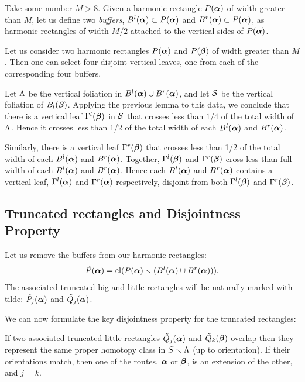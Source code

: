 Take some number $M>8$. 
Given a harmonic rectangle $P({\mbox{\boldmath$\alpha$} })$ of width greater than $M$, let us define two {\it buffers},
 $B^l({\mbox{\boldmath$\alpha$} })\subset P({\mbox{\boldmath$\alpha$} })$ and $B^r({\mbox{\boldmath$\alpha$} })\subset P({\mbox{\boldmath$\alpha$} })$,
as harmonic rectangles of width $M/2$ attached to the vertical sides of $P({\mbox{\boldmath$\alpha$} })$.   

\begin{lem}\label{disjoint curves}
 Let us consider two harmonic rectangles $P({\mbox{\boldmath$\alpha$} })$ and $P({\mbox{\boldmath$\beta$} })$ of width greater than $M$.
Then one can select four disjoint vertical leaves,
 one from each of the corresponding four buffers.
\end{lem}

\begin{pf}
Let ${\Lambda}$ be the vertical foliation in $B^l({\mbox{\boldmath$\alpha$} })\cup B^r({\mbox{\boldmath$\alpha$} })$,
 and let  ${\cal S}$ be the vertical foliation of $B_l({\mbox{\boldmath$\beta$} })$.  
  Applying  the previous lemma to  this data, we conclude that
there is a vertical leaf $\Gamma^l({\mbox{\boldmath$\beta$} })$ in ${\cal S}$ that crosses less than  $1/4$ of the total width of ${\Lambda}$.
Hence it crosses less than  1/2 of the total width of each $B^l({\mbox{\boldmath$\alpha$} })$ and $ B^r({\mbox{\boldmath$\alpha$} })$. 

Similarly, there is a vertical leaf $\Gamma^r({\mbox{\boldmath$\beta$} })$ that crosses less than
1/2 of the total width of each $B^l({\mbox{\boldmath$\alpha$} })$ and $B^r({\mbox{\boldmath$\alpha$} })$.
Together,  $\Gamma^l({\mbox{\boldmath$\beta$} })$ and  $\Gamma^r({\mbox{\boldmath$\beta$} })$ cross less than full width of each $B^l({\mbox{\boldmath$\alpha$} })$ and $B^r({\mbox{\boldmath$\alpha$} })$.
Hence  each $B^l({\mbox{\boldmath$\alpha$} })$ and $B^r({\mbox{\boldmath$\alpha$} })$ contains a vertical leaf, $\Gamma^l({\mbox{\boldmath$\alpha$} })$ and $\Gamma^r({\mbox{\boldmath$\alpha$} })$ respectively,
disjoint from both  $\Gamma^l({\mbox{\boldmath$\beta$} })$ and  $\Gamma^r({\mbox{\boldmath$\beta$} })$. 
\end{pf}


\subsection{Truncated rectangles and Disjointness Property}\label{truncated rectangles} 


Let us remove the buffers from our harmonic rectangles:  
$$ 
     \tilde P({\mbox{\boldmath$\alpha$} })= \operatorname{cl} (P({\mbox{\boldmath$\alpha$} }) \smallsetminus (B^l({\mbox{\boldmath$\alpha$} })\cup B^r({\mbox{\boldmath$\alpha$} }))).
$$
The associated truncated big and little rectangles will be naturally marked with tilde:
$\tilde P_j({\mbox{\boldmath$\alpha$} })$ and  $\tilde Q_j({\mbox{\boldmath$\alpha$} })$. 



We can now formulate the key disjointness property for the truncated rectangles:

\begin{lem}\label{disjointness-2}
  If two associated truncated little rectangles $\tilde Q_j({\mbox{\boldmath$\alpha$} })$ and $\tilde Q_k({\mbox{\boldmath$\beta$} })$ overlap
then they represent the same proper homotopy class in $S\smallsetminus {\Lambda}$ (up to orientation).
If their orientations match,
then one of the routes,  ${\mbox{\boldmath$\alpha$} }$ or  ${\mbox{\boldmath$\beta$} }$, is an extension of the other,
and $j=k$.
\end{lem} 

